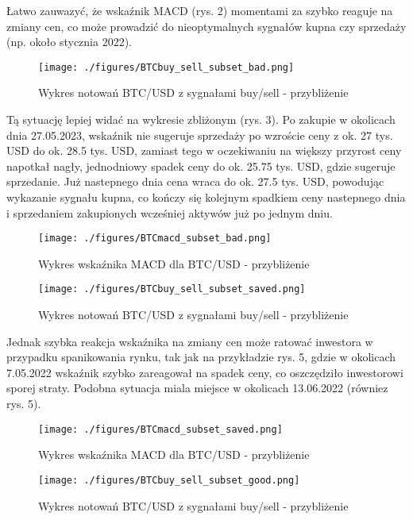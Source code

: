 \documentclass[a4paper,12pt]{article}  %
\begin{document}
Łatwo zauwazyć, że wskaźnik MACD (rys. 2) momentami za szybko reaguje na zmiany
cen, co może prowadzić do nieoptymalnych sygnałów kupna czy sprzedaży (np. około
stycznia 2022). 

\begin{figure}[H]
  \centering
  \texttt{[image: ./figures/BTCbuy\_sell\_subset\_bad.png]}
  \caption{Wykres notowań BTC/USD z sygnałami buy/sell - przybliżenie}
\end{figure}

Tą sytuację lepiej widać na wykresie zbliżonym (rys. 3). Po zakupie w okolicach 
dnia 27.05.2023, wskaźnik nie sugeruje sprzedaży po wzroście ceny z ok. 27 tys.
USD do ok. 28.5 tys. USD, zamiast tego w oczekiwaniu na większy przyrost ceny
napotkał nagły, jednodniowy spadek ceny do ok. 25.75 tys. USD, gdzie sugeruje
sprzedanie. Już nastepnego dnia cena wraca do ok. 27.5 tys. USD, powodując
wykazanie sygnału kupna, co kończy się kolejnym spadkiem ceny nastepnego dnia i
sprzedaniem zakupionych wcześniej aktywów już po jednym dniu.

\begin{figure}[H]
  \centering
  \texttt{[image: ./figures/BTCmacd\_subset\_bad.png]}
  \caption{Wykres wskaźnika MACD dla BTC/USD - przybliżenie}
\end{figure}

\pagebreak

\begin{figure}[H]
  \centering
  \texttt{[image: ./figures/BTCbuy\_sell\_subset\_saved.png]}
  \caption{Wykres notowań BTC/USD z sygnałami buy/sell - przybliżenie}
\end{figure}


Jednak szybka reakcja wskaźnika na zmiany cen może ratować inwestora w przypadku
spanikowania rynku, tak jak na przykładzie rys. 5, gdzie w okolicach 7.05.2022
wskaźnik szybko zareagował na spadek ceny, co oszczędziło inwestorowi sporej
straty. Podobna sytuacja miala miejsce w okolicach 13.06.2022 (równiez rys. 5).


\begin{figure}[H]
  \centering
  \texttt{[image: ./figures/BTCmacd\_subset\_saved.png]}
  \caption{Wykres wskaźnika MACD dla BTC/USD - przybliżenie}
\end{figure}

\pagebreak

\begin{figure}[H]
  \centering
  \texttt{[image: ./figures/BTCbuy\_sell\_subset\_good.png]}
  \caption{Wykres notowań BTC/USD z sygnałami buy/sell - przybliżenie}
\end{figure}
\end{document}
